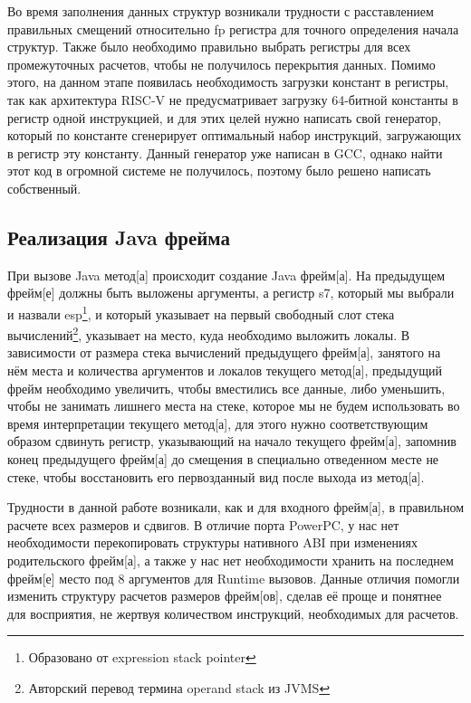  
Во время заполнения данных структур возникали трудности с расставлением правильных смещений относительно fp регистра для точного определения начала структур. Также было необходимо правильно выбрать регистры для всех промежуточных расчетов, чтобы не получилось перекрытия данных. Помимо этого, на данном этапе появилась необходимость загрузки констант в регистры, так как архитектура RISC-V не предусматривает загрузку 64-битной константы в регистр одной инструкцией, и для этих целей нужно написать свой генератор, который по константе сгенерирует оптимальный набор инструкций, загружающих в регистр эту константу. Данный генератор уже написан в GCC, однако найти этот код в огромной системе не получилось, поэтому было решено написать собственный.





\subsection{Реализация Java фрейма}
При вызове Java \gls{метод}[а] происходит создание Java \gls{фрейм}[а]. На предыдущем \gls{фрейм}[е] должны быть выложены аргументы, а регистр s7, который мы выбрали и назвали esp\footnote{Образовано от expression stack pointer}, и который указывает на первый свободный слот стека вычислений\footnote{Авторский перевод термина operand stack из JVMS}, указывает на место, куда необходимо выложить локалы. В зависимости от размера стека вычислений предыдущего \gls{фрейм}[а], занятого на нём места и количества аргументов и локалов текущего \gls{метод}[а], предыдущий \gls{фрейм} необходимо увеличить, чтобы вместились все данные, либо уменьшить, чтобы не занимать лишнего места на стеке, которое мы не будем использовать во время интерпретации текущего \gls{метод}[а], для этого нужно соответствующим образом сдвинуть регистр, указывающий на начало текущего \gls{фрейм}[а], запомнив конец предыдущего \gls{фрейм}[а] до смещения в специально отведенном месте не стеке, чтобы восстановить его первозданный вид после выхода из \gls{метод}[а].

Трудности в данной работе возникали, как и для входного \gls{фрейм}[а], в правильном расчете всех размеров и сдвигов. В отличие порта PowerPC, у нас нет необходимости перекопировать структуры нативного ABI при изменениях родительского \gls{фрейм}[а], а также у нас нет необходимости хранить на последнем \gls{фрейм}[е] место под 8 аргументов для Runtime вызовов. Данные отличия помогли изменить структуру расчетов размеров \gls{фрейм}[ов], сделав её проще и понятнее для восприятия, не жертвуя количеством инструкций, необходимых для расчетов.

